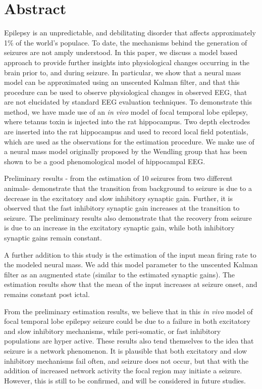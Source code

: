 \section{Abstract}

Epilepsy is an unpredictable, and debilitating disorder that affects approximately 1\% of the world's populace. To date, the mechanisms behind the generation of seizures are not amply understood. In this paper, we discuss a model based approach to provide further insights into physiological changes occurring in the brain prior to, and during seizure. In particular, we show that a neural mass model can be approximated using an unscented Kalman filter, and that this procedure can be used to observe physiological changes in observed EEG, that are not elucidated by standard EEG evaluation techniques. To demonstrate this method, we have made use of an \textsl{in vivo} model of focal temporal lobe epilepsy, where tetanus toxin is injected into the rat hippocampus. Two depth electrodes are inserted into the rat hippocampus and used to record local field potentials, which are used as the observations for the estimation procedure. We make use of a neural mass model originally proposed by the Wendling group that has been shown to be a good phenomological model of hippocampal EEG. 

Preliminary results - from the estimation of 10 seizures from two different animals- demonstrate that the transition from background to seizure is due to a decrease in the excitatory and slow inhibitory synaptic gain. Further, it is observed that the fast inhibitory synaptic gain increases at the transition to seizure. The preliminary results also demonstrate that the recovery from seizure is due to an increase in the excitatory synaptic gain, while both inhibitory synaptic gains remain constant. 

A further addition to this study is the estimation of the input mean firing rate to the modeled neural mass. We add this model parameter to the unscented Kalman filter as an augmented state (similar to the estimated synaptic gains). The estimation results show that the mean of the input increases at seizure onset, and remains constant post ictal.

From the preliminary estimation results, we believe that in this \textsl{in vivo} model of focal temporal lobe epilepsy seizure could be due to a failure in both excitatory and slow inhibitory mechanisms, while peri-somatic, or fast inhibitory populations are hyper active. These results also tend themselves to the idea that seizure is a network phenomenon. It is plausible that both excitatory and slow inhibitory mechanisms fail often, and seizure does not occur, but that with the addition of increased network activity the focal region may initiate a seizure. However, this is still to be confirmed, and will be considered in future studies.

